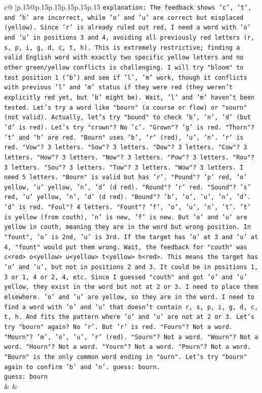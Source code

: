 \documentclass{article}
\begin{document}
{\begin{supertabular}{c@{$\;$}|p{.15\linewidth}@{}p{.15\linewidth}p{.15\linewidth}p{.15\linewidth}p{.15\linewidth}p{.15\linewidth}}
{{{                \texttt{explanation: The feedback shows 'c', 't', and 'h' are incorrect, while 'o' and 'u' are correct but misplaced (yellow). Since 'r' is already ruled out red, I need a word with 'o' and 'u' in positions 3 and 4, avoiding all previously red letters (r, s, p, i, g, d, c, t, h). This is extremely restrictive; finding a valid English word with exactly two specific yellow letters and no other green/yellow conflicts is challenging. I will try "bloom" to test position 1 ('b') and see if 'l', 'm' work, though it conflicts with previous 'l' and 'm' status if they were red (they weren't explicitly red yet, but 'b' might be). Wait, 'l' and 'm' haven't been tested. Let's try a word like "bourn" (a course or flow) or "sourn" (not valid). Actually, let's try "bound" to check 'b', 'n', 'd' (but 'd' is red). Let's try "crown"? No 'c'. "Grown"? 'g' is red. "Thorn"? 't' and 'h' are red. "Bourn" uses 'b', 'r' (red), 'u', 'n'. 'r' is red. "Vow"? 3 letters. "Sow"? 3 letters. "Dow"? 3 letters. "Cow"? 3 letters. "How"? 3 letters. "Now"? 3 letters. "Pow"? 3 letters. "Rou"? 3 letters. "Sou"? 3 letters. "Tow"? 3 letters. "Wow"? 3 letters. I need 5 letters. "Bourn" is valid but has 'r'. "Pound"? 'p' red, 'o' yellow, 'u' yellow, 'n', 'd' (d red). "Round"? 'r' red. "Sound"? 's' red, 'u' yellow, 'n', 'd' (d red). "Bound"? 'b', 'o', 'u', 'n', 'd'. 'd' is red. "Foul"? 4 letters. "Fount"? 'f', 'o', 'u', 'n', 't'. 't' is yellow (from couth), 'n' is new, 'f' is new. But 'o' and 'u' are yellow in couth, meaning they are in the word but wrong position. In "fount", 'o' is 2nd, 'u' is 3rd. If the target has 'o' at 3 and 'u' at 4, "fount" would put them wrong. Wait, the feedback for "couth" was c<red> o<yellow> u<yellow> t<yellow> h<red>. This means the target has 'o' and 'u', but not in positions 2 and 3. It could be in positions 1, 3 or 1, 4 or 2, 4, etc. Since I guessed "couth" and got 'o' and 'u' yellow, they exist in the word but not at 2 or 3. I need to place them elsewhere. 'o' and 'u' are yellow, so they are in the word. I need to find a word with 'o' and 'u' that doesn't contain r, s, p, i, g, d, c, t, h. And fits the pattern where 'o' and 'u' are not at 2 or 3. Let's try "bourn" again? No 'r'. But 'r' is red. "Fourn"? Not a word. "Mourn"? 'm', 'o', 'u', 'r' (red). "Sourn"? Not a word. "Wourn"? Not a word. "Hourn"? Not a word. "Yourn"? Not a word. "Pourn"? Not a word. "Bourn" is the only common word ending in "ourn". Let's try "bourn" again to confirm 'b' and 'n'. guess: bourn.} \\
\texttt{guess: bourn} \\
            }
        }
    }
    & & \\ \\


\end{supertabular}}
\end{document}
